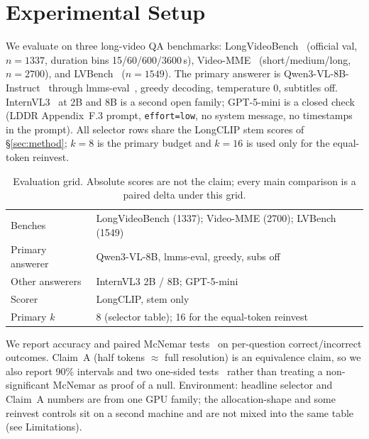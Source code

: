 \documentclass[11pt]{article}
\begin{document}
\section{Experimental Setup}
\label{sec:setup}

We evaluate on three long-video QA benchmarks: LongVideoBench~\citep{wu2024longvideobench} (official val, $n{=}1337$, duration bins 15/60/600/3600\,s), Video-MME~\citep{fu2025videomme} (short/medium/long, $n{=}2700$), and LVBench~\citep{lvbench2025} ($n{=}1549$).
The primary answerer is Qwen3-VL-8B-Instruct~\citep{qwen3vl2025} through lmms-eval~\citep{zhang2024lmmseval}, greedy decoding, temperature 0, subtitles off.
InternVL3~\citep{zhu2025internvl3} at 2B and 8B is a second open family; GPT-5-mini is a closed check (LDDR Appendix~F.3 prompt, \texttt{effort=low}, no system message, no timestamps in the prompt).
All selector rows share the LongCLIP stem scores of \S\ref{sec:method}; $k{=}8$ is the primary budget and $k{=}16$ is used only for the equal-token reinvest.

\begin{table}[t]
\centering
\small
\begin{tabular}{@{}lp{}@{}}
\toprule
Benches & LongVideoBench (1337); Video-MME (2700); LVBench (1549) \\
Primary answerer & Qwen3-VL-8B, lmms-eval, greedy, subs off \\
Other answerers & InternVL3 2B / 8B; GPT-5-mini \\
Scorer & LongCLIP, stem only \\
Primary $k$ & 8 (selector table); 16 for the equal-token reinvest \\
\bottomrule
\end{tabular}
\caption{Evaluation grid. Absolute scores are not the claim; every main comparison is a paired delta under this grid.}
\label{tab:setup}
\end{table}

We report accuracy and paired McNemar tests~\citep{mcnemar1947} on per-question correct/incorrect outcomes.
Claim~A (half tokens $\approx$ full resolution) is an equivalence claim, so we also report 90\% intervals and two one-sided tests~\citep{schuirmann1987} rather than treating a non-significant McNemar as proof of a null.
Environment: headline selector and Claim~A numbers are from one GPU family; the allocation-shape and some reinvest controls sit on a second machine and are not mixed into the same table (see Limitations).

\end{document}
